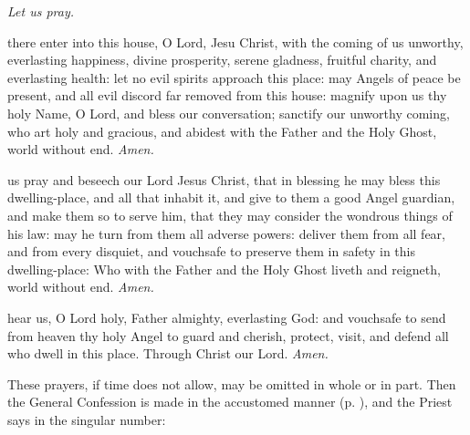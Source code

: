


\par\noindent
\centerline{\textit{Let us pray.}}

 there enter into this house, O Lord, Jesu Christ, with the coming of us unworthy, everlasting happiness, divine prosperity, serene gladness, fruitful charity, and everlasting health: let no evil spirits approach this place: may Angels of peace be present, and all evil discord far removed from this house: magnify upon us thy holy Name, O Lord, and {} bless our conversation; sanctify our unworthy coming, who art holy and gracious, and abidest with the Father and the Holy Ghost, world without end. \textit{Amen.}\par
{} us pray and beseech our Lord Jesus Christ, that in blessing he may {} bless this dwelling-place, and all that inhabit it, and give to them a good Angel guardian, and make them so to serve him, that they may consider the wondrous things of his law: may he turn from them all adverse powers: deliver them from all fear, and from every disquiet, and vouchsafe to preserve them in safety in this dwelling-place: Who with the Father and the Holy Ghost liveth and reigneth, world without end. \textit{Amen.}\par
{}
{} hear us, O Lord holy, Father almighty, everlasting God: and vouchsafe to send from heaven thy holy Angel to guard and cherish, protect, visit, and defend all who dwell in this place. Through Christ our Lord. \textit{Amen.}
\begin{rubric}
    These prayers, if time does not allow, may be omitted in whole or in part. Then the General Confession is made in the accustomed manner (p. \pageref{Confiteor}), and the Priest says in the singular number:
\end{rubric}
